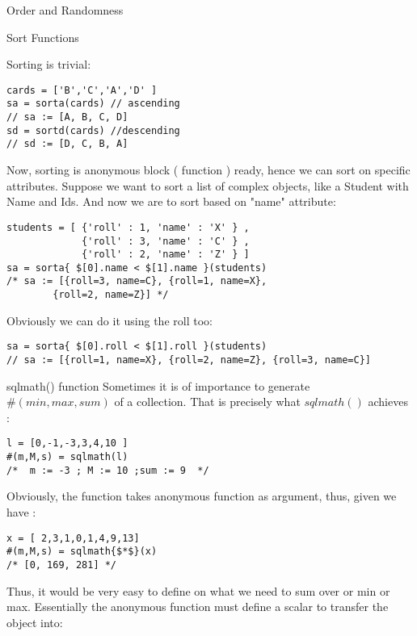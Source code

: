 \begin{section}{Order and Randomness}
\begin{subsection}{Sort Functions}

Sorting is trivial:
\begin{lstlisting}[style=JexlStyle]
cards = ['B','C','A','D' ]
sa = sorta(cards) // ascending 
// sa := [A, B, C, D]
sd = sortd(cards) //descending 
// sd := [D, C, B, A]
\end{lstlisting}  


Now, sorting is anonymous block ( function ) ready, 
hence we can sort on specific attributes. 
Suppose we want to sort a list of complex objects, like a Student with Name and Ids.
And now we are to sort based on "name" attribute: 

\begin{lstlisting}[style=JexlStyle]
students = [ {'roll' : 1, 'name' : 'X' } , 
             {'roll' : 3, 'name' : 'C' } , 
             {'roll' : 2, 'name' : 'Z' } ]
sa = sorta{ $[0].name < $[1].name }(students)
/* sa := [{roll=3, name=C}, {roll=1, name=X}, 
        {roll=2, name=Z}] */
\end{lstlisting}  

Obviously we can do it using the roll too:

\begin{lstlisting}[style=JexlStyle]
sa = sorta{ $[0].roll < $[1].roll }(students)
// sa := [{roll=1, name=X}, {roll=2, name=Z}, {roll=3, name=C}]
\end{lstlisting}  
\end{subsection}

\begin{subsection}{sqlmath() function}
Sometimes it is of importance to generate $\#(min,max,sum)$
of a collection. That is precisely what $sqlmath()$ achieves :

\begin{lstlisting}[style=JexlStyle]
l = [0,-1,-3,3,4,10 ]
#(m,M,s) = sqlmath(l)
/*  m := -3 ; M := 10 ;sum := 9  */
\end{lstlisting}  

Obviously, the function takes anonymous function as argument,
thus, given we have :

\begin{lstlisting}[style=JexlStyle]
x = [ 2,3,1,0,1,4,9,13]
#(m,M,s) = sqlmath{$*$}(x)
/* [0, 169, 281] */
\end{lstlisting}  
 
Thus, it would be very easy to define on what we need to sum over or min or max. 
Essentially the anonymous function must define a scalar to transfer the object into: 


\end{subsection}
\end{section}
